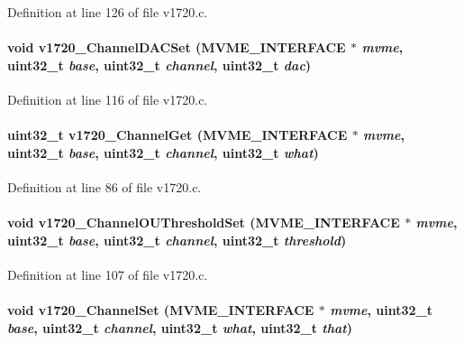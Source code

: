 Definition at line 126 of file v1720.c.
\paragraph[{v1720\_\-ChannelDACSet}]{\setlength{\rightskip}{0pt plus 5cm}void v1720\_\-ChannelDACSet ({\bf MVME\_\-INTERFACE} $\ast$ {\em mvme}, \/  uint32\_\-t {\em base}, \/  uint32\_\-t {\em channel}, \/  uint32\_\-t {\em dac})}\hfill\label{v1720_8c_aa7e18074b708f4ce0a8530dd7c007caf}


Definition at line 116 of file v1720.c.
\paragraph[{v1720\_\-ChannelGet}]{\setlength{\rightskip}{0pt plus 5cm}uint32\_\-t v1720\_\-ChannelGet ({\bf MVME\_\-INTERFACE} $\ast$ {\em mvme}, \/  uint32\_\-t {\em base}, \/  uint32\_\-t {\em channel}, \/  uint32\_\-t {\em what})}\hfill\label{v1720_8c_a9f2af1cbc3d42e6b13c84db35cf07c4f}


Definition at line 86 of file v1720.c.
\paragraph[{v1720\_\-ChannelOUThresholdSet}]{\setlength{\rightskip}{0pt plus 5cm}void v1720\_\-ChannelOUThresholdSet ({\bf MVME\_\-INTERFACE} $\ast$ {\em mvme}, \/  uint32\_\-t {\em base}, \/  uint32\_\-t {\em channel}, \/  uint32\_\-t {\em threshold})}\hfill\label{v1720_8c_ad23d27240d4832dda63108a2642c8ac9}


Definition at line 107 of file v1720.c.
\paragraph[{v1720\_\-ChannelSet}]{\setlength{\rightskip}{0pt plus 5cm}void v1720\_\-ChannelSet ({\bf MVME\_\-INTERFACE} $\ast$ {\em mvme}, \/  uint32\_\-t {\em base}, \/  uint32\_\-t {\em channel}, \/  uint32\_\-t {\em what}, \/  uint32\_\-t {\em that})}\hfill\label{v1720_8c_aaa370ced27664e48c762a4cb15ebd4bc}


